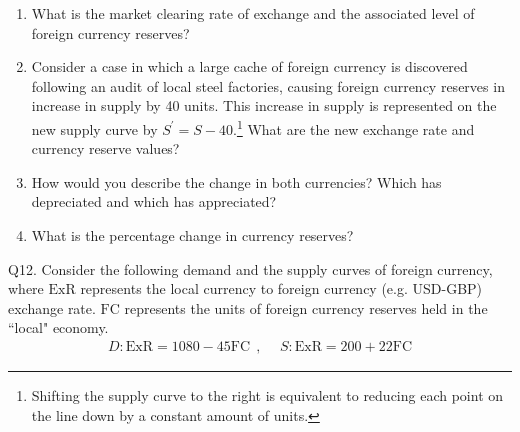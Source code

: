 \documentclass[12pt]{article}
\begin{document}
\begin{enumerate}[1)]
	
\item What is the market clearing rate of exchange and the associated level of foreign currency reserves?

\vspace{0.8in}

\item Consider a case in which a large cache of foreign currency is discovered following an audit of local steel factories, causing foreign currency reserves in increase in supply by 40 units. This increase in supply is represented on the new supply curve by $S^{'} = S - 40$.\footnote{Shifting the supply curve to the right is equivalent to reducing each point on the line down by a constant amount of units.}
What are the new exchange rate and currency reserve values?

\vspace{0.8in}

\item How would you describe the change in both currencies? Which has depreciated and which has appreciated?

\vspace{0.8in}

\item What is the percentage change in currency reserves?

\vspace{0.8in}
	
\end{enumerate}

\noindent Q12. Consider the following demand and the supply curves of foreign currency, where $\text{ExR}$ represents the local currency to foreign currency (e.g. USD-GBP) exchange rate.
$\text{FC}$ represents the units of foreign currency reserves held in the ``local" economy. 
\begin{align*}
D: \text{ExR} =  1080 - 45 \text{FC} \ \ , & \ \ S: \text{ExR} =  200 + 22 \text{FC}
\end{align*}
\end{document}
